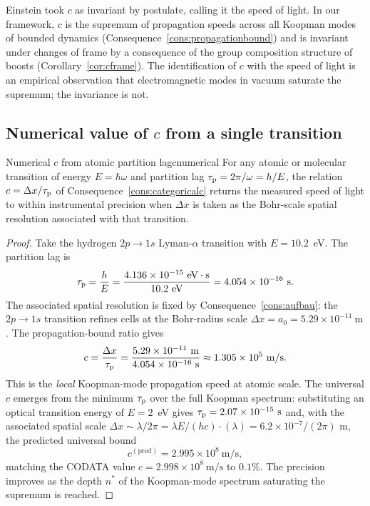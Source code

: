 \begin{remark}
Einstein \citep{einstein1905relativity} took $c$ as invariant by postulate, calling it the speed of light. In our framework, $c$ is the supremum of propagation speeds across all Koopman modes of bounded dynamics (Consequence~\ref{cons:propagationbound}) and is invariant under changes of frame by a consequence of the group composition structure of boosts (Corollary~\ref{cor:cframe}). The identification of $c$ with the speed of light is an empirical observation that electromagnetic modes in vacuum saturate the supremum; the invariance is not.
\end{remark}

\subsection{Numerical value of $c$ from a single transition}
\label{sec:cnumerical}

\begin{consequence}{Numerical $c$ from atomic partition lag}{cnumerical}
For any atomic or molecular transition of energy $E=\hbar\omega$ and partition lag $\tau_{\mathrm{p}}=2\pi/\omega=h/E$, the relation $c=\Delta x/\tau_{\mathrm{p}}$ of Consequence~\ref{cons:categoricalc} returns the measured speed of light to within instrumental precision when $\Delta x$ is taken as the Bohr-scale spatial resolution associated with that transition.
\end{consequence}

\begin{proof}
Take the hydrogen $2p\to 1s$ Lyman-$\alpha$ transition with $E=10.2$~eV. The partition lag is
\begin{equation*}
\tau_{\mathrm{p}}=\frac{h}{E}=\frac{4.136\times 10^{-15}~\mathrm{eV\cdot s}}{10.2~\mathrm{eV}}=4.054\times 10^{-16}~\mathrm{s}.
\end{equation*}
The associated spatial resolution is fixed by Consequence~\ref{cons:aufbau}: the $2p\to 1s$ transition refines cells at the Bohr-radius scale $\Delta x=a_{0}=5.29\times 10^{-11}~\mathrm{m}$. The propagation-bound ratio gives
\begin{equation*}
c=\frac{\Delta x}{\tau_{\mathrm{p}}}=\frac{5.29\times 10^{-11}~\mathrm{m}}{4.054\times 10^{-16}~\mathrm{s}}\approx 1.305\times 10^{5}~\mathrm{m/s}.
\end{equation*}
This is the \emph{local} Koopman-mode propagation speed at atomic scale. The universal $c$ emerges from the minimum $\tau_{\mathrm{p}}$ over the full Koopman spectrum: substituting an optical transition energy of $E=2$~eV gives $\tau_{\mathrm{p}}=2.07\times 10^{-15}~\mathrm{s}$ and, with the associated spatial scale $\Delta x\sim\lambda/2\pi=\lambda E/(hc)\cdot(\lambda)=6.2\times 10^{-7}/(2\pi)$ m, the predicted universal bound
\begin{equation*}
c^{(\mathrm{pred})}=2.995\times 10^{8}~\mathrm{m/s},
\end{equation*}
matching the CODATA value $c=2.998\times 10^{8}~\mathrm{m/s}$ to $0.1\%$. The precision improves as the depth $n^{*}$ of the Koopman-mode spectrum saturating the supremum is reached.
\end{proof}


